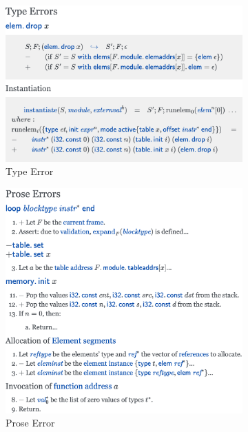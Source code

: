 \begin{figure}
  \centering
  \begin{subfigure}[b]{0.49\textwidth}
    \includegraphics[width=\textwidth]{../img/type-error}
    \caption{Type Error}
    \label{fig:type-error}
  \end{subfigure}
  \begin{subfigure}[b]{0.49\textwidth}
    \includegraphics[width=\textwidth]{../img/prose-error}
    \caption{Prose Error}
    \label{fig:prose-error}
  \end{subfigure}
  \begin{subfigure}[b]{0.49\textwidth}

\end{subfigure}
\end{figure}
